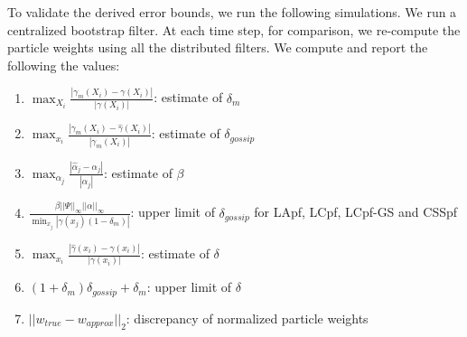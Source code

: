 \documentclass[10pt,letterpaper,final]{article}
\begin{document}
To validate the derived error bounds, we run the following simulations. We run a centralized bootstrap filter. At each time step, for comparison, we re-compute the particle weights using all the distributed filters. We compute and report the following the values:
\begin{enumerate}
\item $\max_{X_i} \frac{|\gamma_{m}(X_i)-\gamma(X_i)|}{|\gamma(X_i)|}$: estimate of $\delta_m$
\item $\max_{x_i} \frac{|\gamma_m(X_i)-\hat{\gamma}(X_i)|}{|\gamma_m(X_i)|}$: estimate of $\delta_{gossip}$ 
\item $\max_{\alpha_j} \frac{\left\vert \hat{\alpha}_j -\alpha_j \right\vert}{|\alpha_j|}$: estimate of $\beta$
\item $\frac{\beta ||\Psi||_\infty ||\alpha||_\infty}{\min_{x_j}|\gamma(x_j)(1-\delta_m)|}$: upper limit of $\delta_{gossip}$ for LApf, LCpf, LCpf-GS and CSSpf
\item $\max_{x_i} \frac{|\hat{\gamma}(x_i) - \gamma(x_i)|}{|\gamma(x_i)|}$: estimate of $\delta$
\item $(1+\delta_m)\delta_{gossip} + \delta_m$: upper limit of $\delta$
\item $||w_{true}-w_{approx}||_2$: discrepancy of normalized particle weights
\end{enumerate} 
\end{document}
